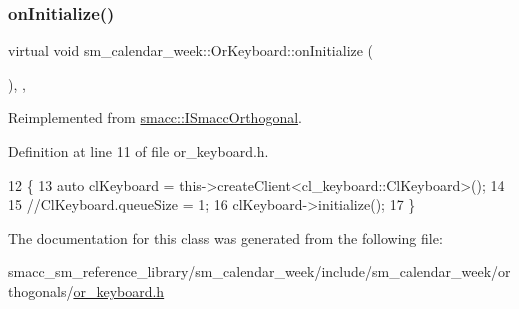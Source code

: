 \subsubsection{\texorpdfstring{on\+Initialize()}{onInitialize()}}
{\footnotesize\ttfamily virtual void sm\+\_\+calendar\+\_\+week\+::\+Or\+Keyboard\+::on\+Initialize (\begin{DoxyParamCaption}{ }\end{DoxyParamCaption})\hspace{0.3cm}{\ttfamily [inline]}, {\ttfamily [override]}, {\ttfamily [virtual]}}



Reimplemented from \hyperlink{classsmacc_1_1ISmaccOrthogonal_a6bb31c620cb64dd7b8417f8705c79c7a}{smacc\+::\+I\+Smacc\+Orthogonal}.



Definition at line 11 of file or\+\_\+keyboard.\+h.


\begin{DoxyCode}
12     \{
13         \textcolor{keyword}{auto} clKeyboard = this->createClient<cl\_keyboard::ClKeyboard>();
14         
15         \textcolor{comment}{//ClKeyboard.queueSize = 1;}
16         clKeyboard->initialize();
17     \}
\end{DoxyCode}


The documentation for this class was generated from the following file\+:\begin{DoxyCompactItemize}
\item 
smacc\+\_\+sm\+\_\+reference\+\_\+library/sm\+\_\+calendar\+\_\+week/include/sm\+\_\+calendar\+\_\+week/orthogonals/\hyperlink{sm__calendar__week_2include_2sm__calendar__week_2orthogonals_2or__keyboard_8h}{or\+\_\+keyboard.\+h}\end{DoxyCompactItemize}
